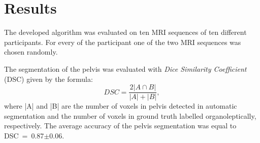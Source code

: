 \section{Results}
The developed algorithm was evaluated on ten MRI sequences of ten different participants. For every of the participant one of the two  MRI sequences was chosen randomly.

The segmentation of the pelvis was evaluated with \textit{Dice Similarity Coefficient} (DSC) given by the formula:
\begin{equation}
	\label{eq:dice}
	DSC = \dfrac{2|A\cap{}B|}{|A|+|B|},
\end{equation}
where |A| and |B| are the number of voxels in pelvis detected  in automatic segmentation and the number of voxels in ground truth labelled organoleptically, respectively.
The average accuracy of the pelvis segmentation was equal to DSC~=~0.87$\pm$0.06.


